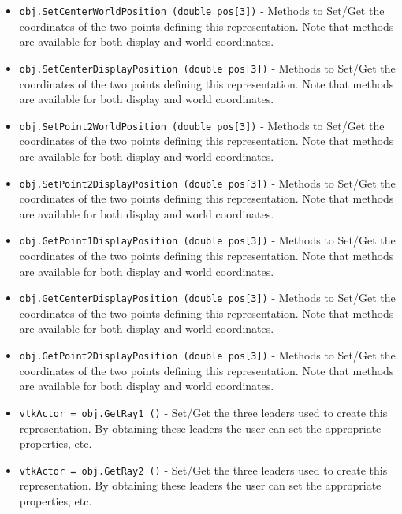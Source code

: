 \begin{itemize}
\item  \verb|obj.SetCenterWorldPosition (double pos[3])| -  Methods to Set/Get the coordinates of the two points defining
 this representation. Note that methods are available for both
 display and world coordinates.

\item  \verb|obj.SetCenterDisplayPosition (double pos[3])| -  Methods to Set/Get the coordinates of the two points defining
 this representation. Note that methods are available for both
 display and world coordinates.

\item  \verb|obj.SetPoint2WorldPosition (double pos[3])| -  Methods to Set/Get the coordinates of the two points defining
 this representation. Note that methods are available for both
 display and world coordinates.

\item  \verb|obj.SetPoint2DisplayPosition (double pos[3])| -  Methods to Set/Get the coordinates of the two points defining
 this representation. Note that methods are available for both
 display and world coordinates.

\item  \verb|obj.GetPoint1DisplayPosition (double pos[3])| -  Methods to Set/Get the coordinates of the two points defining
 this representation. Note that methods are available for both
 display and world coordinates.

\item  \verb|obj.GetCenterDisplayPosition (double pos[3])| -  Methods to Set/Get the coordinates of the two points defining
 this representation. Note that methods are available for both
 display and world coordinates.

\item  \verb|obj.GetPoint2DisplayPosition (double pos[3])| -  Methods to Set/Get the coordinates of the two points defining
 this representation. Note that methods are available for both
 display and world coordinates.

\item  \verb|vtkActor = obj.GetRay1 ()| -  Set/Get the three leaders used to create this representation.
 By obtaining these leaders the user can set the appropriate
 properties, etc.

\item  \verb|vtkActor = obj.GetRay2 ()| -  Set/Get the three leaders used to create this representation.
 By obtaining these leaders the user can set the appropriate
 properties, etc.


\end{itemize}
